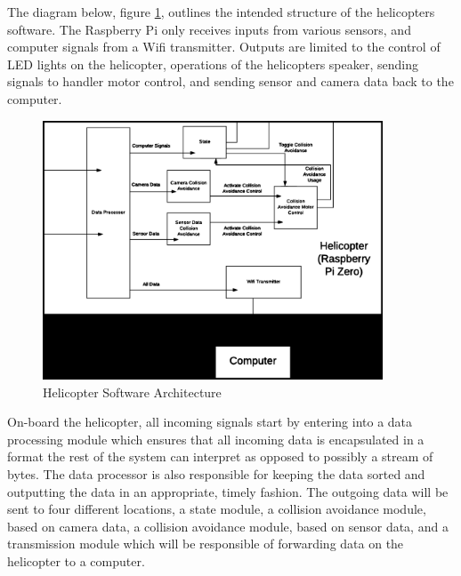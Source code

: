 \documentclass[onecolumn, oneside, letterpaper, draftclsnofoot, 10pt, compsoc]{IEEEtran}
\begin{document}
The diagram below, figure \ref{fig:HelicopterSoftwareArchitecture}, outlines the intended structure of the helicopter\textquotesingle s software. The Raspberry Pi only receives inputs from various sensors, and computer signals from a Wifi transmitter. Outputs are limited to the control of LED lights on the helicopter, operations of the helicopter\textquotesingle s speaker, sending signals to handler motor control, and sending sensor and camera data back to the computer.

\begin{figure}[h]
    \centering
    \includegraphics[width=0.9\textwidth]{graphics/helicopter_diagram.eps}
    \caption{Helicopter Software Architecture}
    \label{fig:HelicopterSoftwareArchitecture}
\end{figure}

On-board the helicopter, all incoming signals start by entering into a data processing module which ensures that all incoming data is encapsulated in a format the rest of the system can interpret as opposed to possibly a stream of bytes. The data processor is also responsible for keeping the data sorted and outputting the data in an appropriate, timely fashion. The outgoing data will be sent to four different locations, a state module, a collision avoidance module, based on camera data, a collision avoidance module, based on sensor data, and a transmission module which will be responsible of forwarding data on the helicopter to a computer. \\
\end{document}
